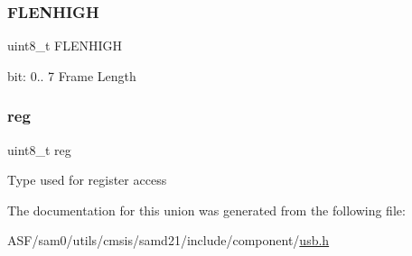 \subsubsection{\texorpdfstring{FLENHIGH}{FLENHIGH}}
{\footnotesize\ttfamily uint8\+\_\+t F\+L\+E\+N\+H\+I\+GH}

bit\+: 0.. 7 Frame Length \mbox{\label{union_u_s_b___h_o_s_t___f_l_e_n_h_i_g_h___type_a9428adc9af4653a2050e2536b55dec8d}} 
\subsubsection{\texorpdfstring{reg}{reg}}
{\footnotesize\ttfamily uint8\+\_\+t reg}

Type used for register access 

The documentation for this union was generated from the following file\+:\begin{DoxyCompactItemize}
\item 
A\+S\+F/sam0/utils/cmsis/samd21/include/component/\mbox{\hyperlink{component_2usb_8h}{usb.\+h}}\end{DoxyCompactItemize}
